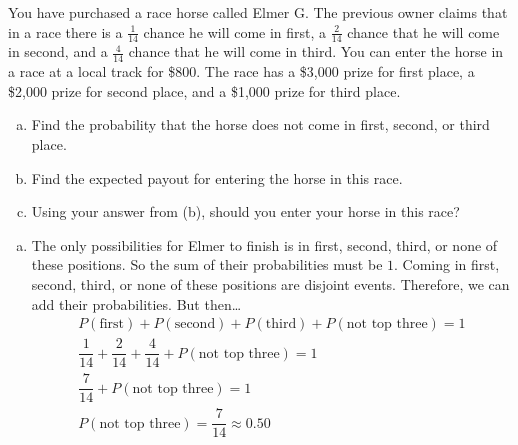 \documentclass[12pt,letterpaper]{exam}
\begin{document}
\examtitle
{} 
\scores
\bottomline
\newpage

\begin{questions}

\newpage
\question[10] You have purchased a race horse called Elmer G. The previous owner claims that in a race there is a $\frac{1}{14}$ chance he will come in first, a $\frac{2}{14}$ chance that he will come in second, and a $\frac{4}{14}$ chance that he will come in third. You can enter the horse in a race at a local track for \$800. The race has a \$3,000 prize for first place, a \$2,000 prize for second place, and a \$1,000 prize for third place. 
	\begin{enumerate}[(a)]
	\item Find the probability that the horse does not come in first, second, or third place. 
	\item Find the expected payout for entering the horse in this race.
	\item Using your answer from (b), should you enter your horse in this race?
	\end{enumerate} \pspace

\sol 
\begin{enumerate}[(a)]
\item The only possibilities for Elmer to finish is in first, second, third, or none of these positions. So the sum of their probabilities must be $1$. Coming in first, second, third, or none of these positions are disjoint events. Therefore, we can add their probabilities. But then\dots
	\[
	\begin{gathered}
	P(\text{first}) + P(\text{second}) + P(\text{third}) + P(\text{not top three}) = 1 \\
	\dfrac{1}{14} + \dfrac{2}{14} + \dfrac{4}{14} + P(\text{not top three}) = 1 \\
	\dfrac{7}{14} + P(\text{not top three}) = 1 \\
	P(\text{not top three}) = \dfrac{7}{14} \approx 0.50
	\end{gathered}
	\] \pspace


\end{enumerate}
\end{questions}
\end{document}
